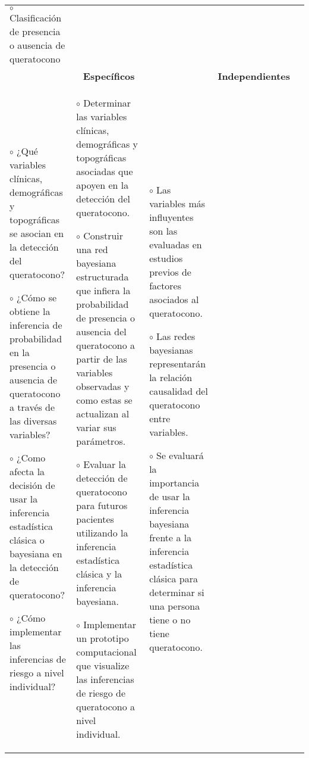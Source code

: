 \begin{landscape}
\begin{table}[h!]
\begin{tabular}{|p{4.5cm}|p{4.5cm}|p{4.5cm}|p{3cm}|p{4.2cm}|}
    $\circ$ Clasificación de presencia o ausencia de queratocono\vspace{0.2cm}
  &                       \\ \cline{1-4}
\multicolumn{3}{|c|}{\textbf{Específicos}}                               & \textbf{Independientes} &  \\ \cline{1-4}
\multicolumn{1}{|p{4.5cm}|}{
    $\circ$ ¿Qué variables clínicas, demográficas y topográficas se asocian en la detección del queratocono?\vspace{0.2cm}

    $\circ$ ¿Cómo se obtiene la inferencia de probabilidad en la presencia o ausencia de queratocono a través de las diversas variables?\vspace{0.2cm}

    $\circ$ ¿Como afecta la decisión de usar la inferencia estadística clásica o bayesiana en la detección de queratocono?\vspace{0.2cm}

    $\circ$ ¿Cómo implementar las inferencias de riesgo a nivel individual?} & \multicolumn{1}{p{4.5cm}|}{
    $\circ$ Determinar las variables clínicas, demográficas y topográficas asociadas que apoyen en la detección del queratocono.\vspace{0.2cm}

    $\circ$ Construir una red bayesiana estructurada que infiera la probabilidad de presencia o ausencia del queratocono a partir de las variables observadas y como estas se actualizan al variar sus parámetros.\vspace{0.2cm}

    $\circ$ Evaluar la detección de queratocono para futuros pacientes utilizando la inferencia estadística clásica y la inferencia bayesiana.\vspace{0.2cm}

    $\circ$ Implementar un prototipo computacional que visualize las inferencias de riesgo de queratocono a nivel individual.

    } & \multicolumn{1}{p{4.5cm}|}{
    $\circ$ Las variables más influyentes son las evaluadas en estudios previos de factores asociados al queratocono.\vspace{0.2cm}

    $\circ$ Las redes bayesianas representarán la relación causalidad del queratocono entre variables.\vspace{0.2cm}

    $\circ$ Se evaluará la importancia de usar la inferencia bayesiana frente a la inferencia estadística clásica para determinar si una persona tiene o no tiene queratocono.\vspace{0.2cm}

}
\end{tabular}
\end{table}
\end{landscape}
